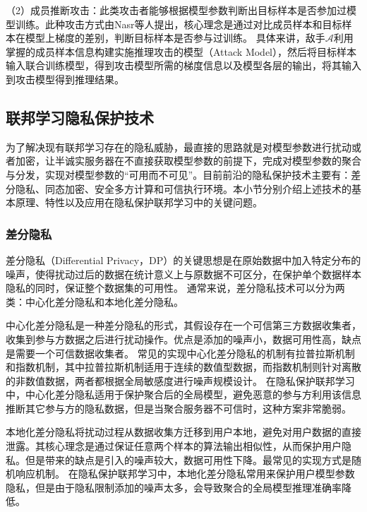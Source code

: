 （2）成员推断攻击：此类攻击者能够根据模型参数判断出目标样本是否参加过模型训练。此种攻击方式由Nasr等人\cite{nasr2019comprehensive}提出，核心理念是通过对比成员样本和目标样本在模型上梯度的差别，判断目标样本是否参与过训练。
具体来讲，敌手$\mathcal{A}$利用掌握的成员样本信息构建实施推理攻击的模型（Attack Model），然后将目标样本输入联合训练模型，得到攻击模型所需的梯度信息以及模型各层的输出，将其输入到攻击模型得到推理结果。


\subsection{联邦学习隐私保护技术}
为了解决现有联邦学习存在的隐私威胁，最直接的思路就是对模型参数进行扰动或者加密，让半诚实服务器在不直接获取模型参数的前提下，完成对模型参数的聚合与分发，实现对模型参数的“可用而不可见”。目前前沿的隐私保护技术主要有：差分隐私、同态加密、安全多方计算和可信执行环境\cite{liuyixian2022FL}。本小节分别介绍上述技术的基本原理、特性以及应用在隐私保护联邦学习中的关键问题。

\subsubsection{差分隐私}
差分隐私（Differential Privacy，DP）\cite{dwork2006differential}的关键思想是在原始数据中加入特定分布的噪声，使得扰动过后的数据在统计意义上与原数据不可区分，在保护单个数据样本隐私的同时，保证整个数据集的可用性。
通常来说，差分隐私技术可以分为两类：中心化差分隐私和本地化差分隐私。

中心化差分隐私是一种差分隐私的形式，其假设存在一个可信第三方数据收集者，收集到参与方数据之后进行扰动操作。优点是添加的噪声小，数据可用性高，缺点是需要一个可信数据收集者。
常见的实现中心化差分隐私的机制有拉普拉斯机制\cite{dwork2006calibrating}和指数机制\cite{mcsherry2007mechanism}，其中拉普拉斯机制适用于连续的数值型数据，而指数机制则针对离散的非数值数据，两者都根据全局敏感度进行噪声规模设计。
在隐私保护联邦学习中，中心化差分隐私适用于保护聚合后的全局模型，避免恶意的参与方利用该信息推断其它参与方的隐私数据，但是当聚合服务器不可信时，这种方案非常脆弱。

本地化差分隐私将扰动过程从数据收集方迁移到用户本地，避免对用户数据的直接泄露。其核心理念是通过保证任意两个样本的算法输出相似性，从而保护用户隐私。但是带来的缺点是引入的噪声较大，数据可用性下降。最常见的实现方式是随机响应机制\cite{20181981}。
在隐私保护联邦学习中，本地化差分隐私常用来保护用户模型参数隐私，但是由于隐私限制添加的噪声太多，会导致聚合的全局模型推理准确率降低。

